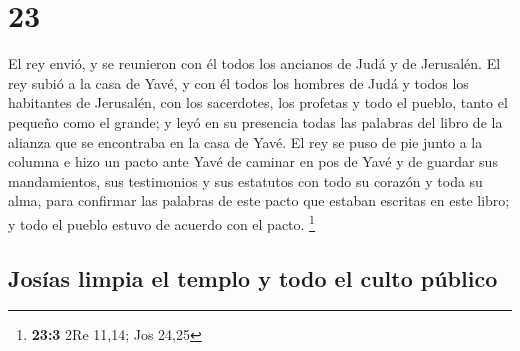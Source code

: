 \hypertarget{section-22}{%
\section{23}\label{section-22}}

 El rey envió, y se reunieron con él todos los ancianos de
Judá y de Jerusalén.  El rey subió a la casa de Yavé, y
con él todos los hombres de Judá y todos los habitantes de Jerusalén,
con los sacerdotes, los profetas y todo el pueblo, tanto el pequeño como
el grande; y leyó en su presencia todas las palabras del libro de la
alianza que se encontraba en la casa de Yavé.  El rey se
puso de pie junto a la columna e hizo un pacto ante Yavé de caminar en
pos de Yavé y de guardar sus mandamientos, sus testimonios y sus
estatutos con todo su corazón y toda su alma, para confirmar las
palabras de este pacto que estaban escritas en este libro; y todo el
pueblo estuvo de acuerdo con el pacto. \footnote{\textbf{23:3} 2Re
  11,14; Jos 24,25}

\hypertarget{josuxedas-limpia-el-templo-y-todo-el-culto-puxfablico}{%
\subsection{Josías limpia el templo y todo el culto
público}\label{josuxedas-limpia-el-templo-y-todo-el-culto-puxfablico}}

